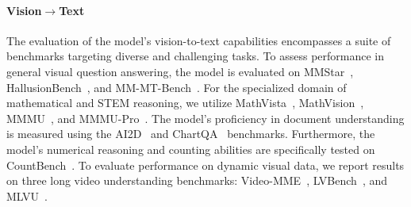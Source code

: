 \paragraph{Vision$\to$Text}
The evaluation of the model's vision-to-text capabilities encompasses a suite of benchmarks targeting diverse and challenging tasks. To assess performance in general visual question answering, the model is evaluated on MMStar~\citep{chen2024we}, HallusionBench~\citep{hallusionbench}, and MM-MT-Bench~\citep{agrawal2024pixtral12b}. For the specialized domain of mathematical and STEM reasoning, we utilize MathVista~\citep{mathvista}, MathVision~\citep{mathvision}, MMMU~\citep{yue2023mmmu}, and MMMU-Pro~\citep{mmmupro}. The model's proficiency in document understanding is measured using the AI2D~\citep{kembhavi2016diagram} and ChartQA~\citep{masry2022chartqa} benchmarks. Furthermore, the model's numerical reasoning and counting abilities are specifically tested on CountBench~\citep{countbench}. To evaluate performance on dynamic visual data, we report results on three long video understanding benchmarks: Video-MME~\citep{fu2024video}, LVBench~\citep{lvbench}, and MLVU~\citep{mlvu}.





